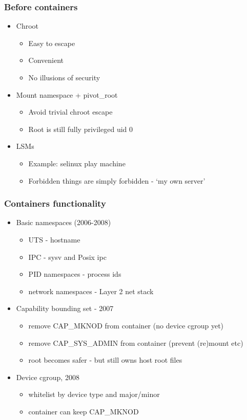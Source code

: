 \documentclass{beamer}
\begin{document}
\begin{frame}
\frametitle{Before containers}
  \begin{itemize}
    \item Chroot
      \begin{itemize}
        \item Easy to escape
        \item Convenient
        \item No illusions of security
      \end{itemize}
\pause
    \item Mount namespace + pivot\_root
  \begin{itemize}
  \item Avoid trivial chroot escape
  \item Root is still fully privileged uid 0
  \end{itemize}

\pause
    \item LSMs
      \begin{itemize}
        \item Example: selinux play machine
        \item Forbidden things are simply forbidden - `my own server'
      \end{itemize}
  \end{itemize}

\end{frame}

\begin{frame}
\frametitle{Containers functionality}
\begin{itemize}
\item Basic namespaces (2006-2008)
  \begin{itemize}
  \item UTS - hostname
  \item IPC - sysv and Posix ipc
  \item PID namespaces - process ids
  \item network namespaces - Layer 2 net stack
  \end{itemize}

\item Capability bounding set - 2007
  \begin{itemize}
    \item remove CAP\_MKNOD from container (no device cgroup yet)
    \item remove CAP\_SYS\_ADMIN from container (prevent (re)mount etc)
    \item root becomes safer - but still owns host root files
  \end{itemize}

\item Device cgroup, 2008
  \begin{itemize}
  \item whitelist by device type and major/minor
  \item container can keep CAP\_MKNOD
  \end{itemize}
\end{itemize}
\end{frame}
\end{document}
